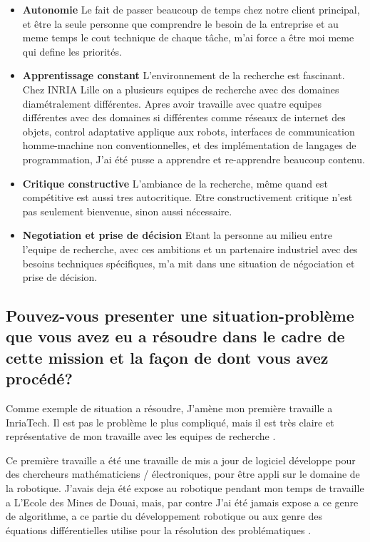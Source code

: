 \documentclass{resume} %
\begin{document}
			\begin{itemize} 				
			\item \textbf{Autonomie} \newline
				Le fait de passer beaucoup de temps chez notre client principal, et être la seule personne que comprendre le besoin de la entreprise et au meme temps le cout technique de chaque tâche, m'ai force a être moi meme qui define les priorités. 
			\item \textbf{Apprentissage constant } \newline
				L'environnement de la recherche est fascinant. Chez INRIA Lille on a plusieurs equipes de recherche avec des domaines diamétralement différentes. Apres avoir travaille avec quatre equipes différentes avec des domaines si différentes comme réseaux de internet des objets, control adaptative applique aux robots,  interfaces de communication homme-machine non conventionnelles, et des implémentation de langages de programmation, J'ai été pusse a apprendre et re-apprendre beaucoup contenu. 
			\item \textbf{Critique constructive} \newline
				L'ambiance de la recherche, même quand est compétitive est aussi tres autocritique. Etre constructivement critique n'est pas seulement bienvenue, sinon aussi nécessaire.
			\item \textbf{Negotiation et prise de décision } \newline
				Etant la personne au milieu entre l'equipe de recherche, avec ces ambitions et un partenaire industriel avec des besoins techniques spécifiques, m'a mit dans une situation de négociation  et prise de décision. 
		\end{itemize}

		
	\subsection{Pouvez-vous presenter une situation-problème que vous avez eu a résoudre dans le cadre de cette mission et la façon de dont vous avez procédé?}
	
		Comme exemple de situation a résoudre, J'amène mon première travaille a InriaTech. Il est pas le problème le plus compliqué, mais il est très claire et représentative de mon travaille avec les equipes de recherche .  
		
		 Ce première travaille a été une travaille de mis a jour de logiciel développe pour des chercheurs mathématiciens / électroniques, pour être appli sur le domaine de la robotique. 
		J'avais deja été expose au robotique pendant mon temps de travaille a L'Ecole des Mines de Douai, mais, par contre J'ai été jamais expose a ce genre de algorithme, a ce partie du développement robotique ou aux genre des équations différentielles utilise pour la résolution des problématiques . 
		
\end{document}
